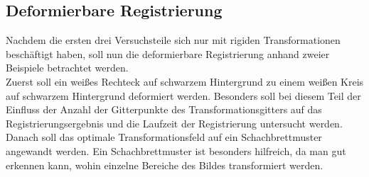 \subsection{Deformierbare Registrierung}
Nachdem die ersten drei Versuchsteile sich nur mit rigiden Transformationen
beschäftigt haben, soll nun die deformierbare Registrierung anhand zweier
Beispiele betrachtet werden.\\
Zuerst soll ein weißes Rechteck auf schwarzem Hintergrund zu einem weißen Kreis
auf schwarzem Hintergrund deformiert werden. Besonders soll bei diesem Teil der
Einfluss der Anzahl der Gitterpunkte des Transformationsgitters auf das
Registrierungsergebnis und die Laufzeit der Registrierung untersucht werden.
Danach soll das optimale Transformationsfeld auf ein Schachbrettmuster
angewandt werden. Ein Schachbrettmuster ist besonders hilfreich, da man gut
erkennen kann, wohin einzelne Bereiche des Bildes transformiert werden.
